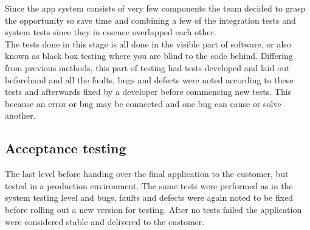 Since the app system consists of very few components the team decided to grasp the opportunity so save time and combining a few of the integration tests and system tests since they in essence overlapped each other.\\

The tests done in this stage is all done in the visible part of software, or also known as black box testing where you are blind to the code behind. Differing from previous methods, this part of testing had tests developed and laid out beforehand and all the faults, bugs and defects were noted according to these tests and afterwards fixed by a developer before commencing new tests. This because an error or bug may be connected and one bug can cause or solve another.
\subsection{Acceptance testing}
\label{def:accTesting}
The last level before handing over the final application to the customer, but tested in a production environment. The same tests were performed as in the system testing level and bugs, faults and defects were again noted to be fixed before rolling out a new version for testing. After no tests failed the application were considered stable and delivered to the customer.




